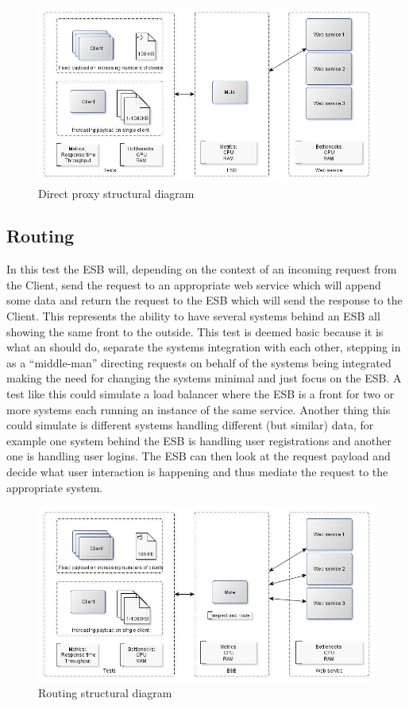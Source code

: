 \begin{figure}[H]
	\centerline{\includegraphics[scale=0.43]{img/direct_proxy}}
	\caption{Direct proxy structural diagram}
\end{figure}

\subsection{Routing}
In this test the ESB will, depending on the context of an incoming request from the Client, send the request to an appropriate web service which will append some data and return the request to the ESB which will send the response to the Client.
This represents the ability to have several systems behind an ESB all showing the same front to the outside.
This test is deemed basic because it is what an should do, separate the systems integration with each other, stepping in as a ``middle-man'' directing requests on behalf of the systems being integrated making the need for changing the systems minimal and just focus on the ESB. 
A test like this could simulate a load balancer where the ESB is a front for two or more systems each running an instance of the same service. Another thing this could simulate is different systems handling different (but similar) data, for example one system behind the ESB is handling user registrations and another one is handling user logins. The ESB can then look at the request payload and decide what user interaction is happening and thus mediate the request to the appropriate system.

\begin{figure}[H]
	\centerline{\includegraphics[scale=0.43]{img/Routing}}
	\caption{Routing structural diagram}
\end{figure}

